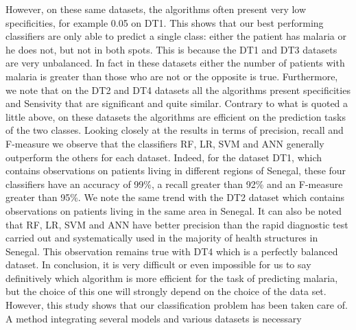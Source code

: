 However, on these same datasets, the algorithms often present very low specificities, for example 0.05 on DT1. This shows that our best performing classifiers are only able to predict a single class: either the patient has malaria or he does not, but not in both spots. This is because the DT1 and DT3 datasets are very unbalanced. In fact in these datasets either the number of patients with malaria is greater than those who are not or the opposite is true. Furthermore, we note that on the DT2 and DT4 datasets all the algorithms present specificities and Sensivity that are significant and quite similar. Contrary to what is quoted a little above, on these datasets the algorithms are efficient on the prediction tasks of the two classes. Looking closely at the results in terms of precision, recall and F-measure we observe that the classifiers RF, LR, SVM and ANN generally outperform the others for each dataset. Indeed, for the dataset DT1, which contains observations on patients living in different regions of Senegal, these four classifiers have an accuracy of 99\%, a recall greater than 92\% and an F-measure greater than 95\%. We note the same trend with the DT2 dataset which contains observations on patients living in the same area in Senegal. It can also be noted that RF, LR, SVM and ANN have better precision than the rapid diagnostic test carried out and systematically used in the majority of health structures in Senegal. This observation remains true with DT4 which is a perfectly balanced dataset. In conclusion, it is very difficult or even impossible for us to say definitively which algorithm is more efficient for the task of predicting malaria, but the choice of this one will strongly depend on the choice of the data set. However, this study shows that our classification problem has been taken care of. A method integrating several models and various datasets is necessary

